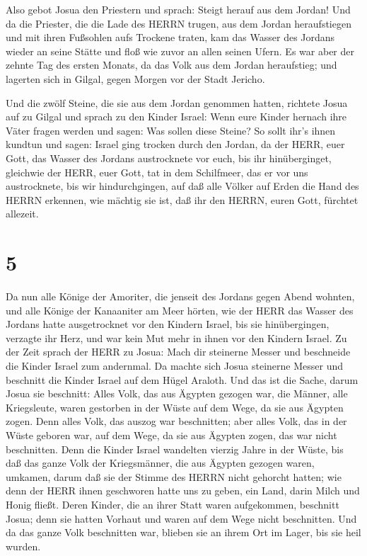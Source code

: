  Also gebot Josua den Priestern und sprach: Steigt herauf
aus dem Jordan!  Und da die Priester, die die Lade des
HERRN trugen, aus dem Jordan heraufstiegen und mit ihren Fußsohlen aufs
Trockene traten, kam das Wasser des Jordans wieder an seine Stätte und
floß wie zuvor an allen seinen Ufern.  Es war aber der
zehnte Tag des ersten Monats, da das Volk aus dem Jordan heraufstieg;
und lagerten sich in Gilgal, gegen Morgen vor der Stadt Jericho.

 Und die zwölf Steine, die sie aus dem Jordan genommen
hatten, richtete Josua auf zu Gilgal  und sprach zu den
Kinder Israel: Wenn eure Kinder hernach ihre Väter fragen werden und
sagen: Was sollen diese Steine?  So sollt ihr's ihnen
kundtun und sagen: Israel ging trocken durch den Jordan, 
da der HERR, euer Gott, das Wasser des Jordans austrocknete vor euch,
bis ihr hinüberginget, gleichwie der HERR, euer Gott, tat in dem
Schilfmeer, das er vor uns austrocknete, bis wir hindurchgingen,
 auf daß alle Völker auf Erden die Hand des HERRN erkennen,
wie mächtig sie ist, daß ihr den HERRN, euren Gott, fürchtet allezeit.

\hypertarget{section-4}{%
\section{5}\label{section-4}}

 Da nun alle Könige der Amoriter, die jenseit des Jordans
gegen Abend wohnten, und alle Könige der Kanaaniter am Meer hörten, wie
der HERR das Wasser des Jordans hatte ausgetrocknet vor den Kindern
Israel, bis sie hinübergingen, verzagte ihr Herz, und war kein Mut mehr
in ihnen vor den Kindern Israel.  Zu der Zeit sprach der
HERR zu Josua: Mach dir steinerne Messer und beschneide die Kinder
Israel zum andernmal.  Da machte sich Josua steinerne Messer
und beschnitt die Kinder Israel auf dem Hügel Araloth.  Und
das ist die Sache, darum Josua sie beschnitt: Alles Volk, das aus
Ägypten gezogen war, die Männer, alle Kriegsleute, waren gestorben in
der Wüste auf dem Wege, da sie aus Ägypten zogen.  Denn
alles Volk, das auszog war beschnitten; aber alles Volk, das in der
Wüste geboren war, auf dem Wege, da sie aus Ägypten zogen, das war nicht
beschnitten.  Denn die Kinder Israel wandelten vierzig Jahre
in der Wüste, bis daß das ganze Volk der Kriegsmänner, die aus Ägypten
gezogen waren, umkamen, darum daß sie der Stimme des HERRN nicht
gehorcht hatten; wie denn der HERR ihnen geschworen hatte uns zu geben,
ein Land, darin Milch und Honig fließt.  Deren Kinder, die
an ihrer Statt waren aufgekommen, beschnitt Josua; denn sie hatten
Vorhaut und waren auf dem Wege nicht beschnitten.  Und da
das ganze Volk beschnitten war, blieben sie an ihrem Ort im Lager, bis
sie heil wurden.

